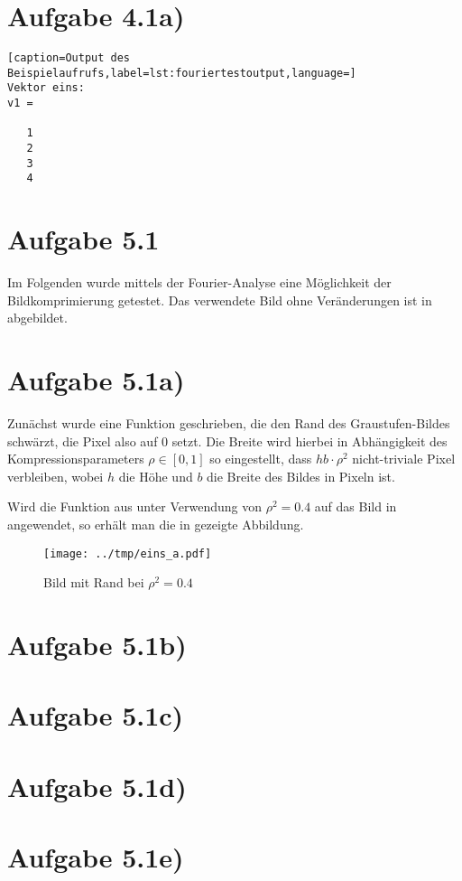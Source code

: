 \section*{Aufgabe 4.1a)}
\begin{lstlisting}[caption=Output des Beispielaufrufs,label=lst:fouriertestoutput,language=]
Vektor eins: 
v1 =

   1
   2
   3
   4
\end{lstlisting}



\section*{Aufgabe 5.1}
Im Folgenden wurde mittels der Fourier-Analyse eine Möglichkeit der Bildkomprimierung
getestet. Das verwendete Bild ohne Veränderungen ist in  abgebildet.


\section*{Aufgabe 5.1a)}

Zunächst wurde eine Funktion  geschrieben, die den Rand des Graustufen-Bildes
schwärzt, die Pixel also auf 0 setzt. Die Breite wird hierbei in Abhängigkeit
des Kompressionsparameters $ρ \in [0,1]$ so eingestellt, dass $hb\cdot ρ^2$
nicht-triviale Pixel verbleiben, wobei $h$ die Höhe und $b$ die Breite des
Bildes in Pixeln ist.



Wird die Funktion aus  unter Verwendung von $ρ^2 = 0.4$ auf das
Bild in  angewendet, so erhält man die in  gezeigte Abbildung.

\begin{figure}[htb]
\centering
  \texttt{[image: ../tmp/eins\_a.pdf]}
  \caption{Bild mit Rand bei $ρ^2 = 0.4$}
  \label{fig:1a}
\end{figure}

\section*{Aufgabe 5.1b)}
\section*{Aufgabe 5.1c)}
\section*{Aufgabe 5.1d)}
\section*{Aufgabe 5.1e)}